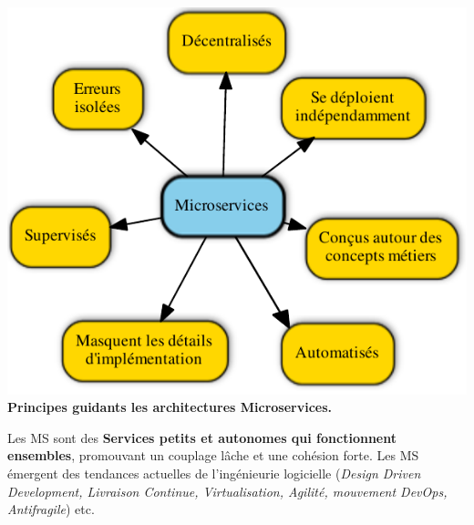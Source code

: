 \documentclass[portrait,final,a0paper]{baposter}
\begin{document}
\begin{poster}
{  \begin{center}
   \includegraphics[width=\textwidth]{msprinciples}
   \textbf{Principes guidants les architectures Microservices.}
   \end{center}
   
   Les MS sont des \textbf{Services petits et autonomes qui fonctionnent ensembles}, promouvant un couplage lâche et une cohésion forte.
   Les MS émergent des tendances actuelles de l'ingénieurie logicielle (\textit{Design Driven Development, Livraison Continue, Virtualisation, Agilité, mouvement DevOps, Antifragile}) etc.
   
   
   
	


 }
\end{poster}
\end{document}

